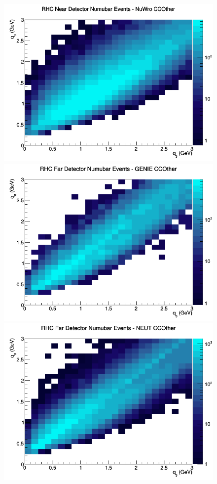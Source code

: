 \documentclass[12pt]{article}
\begin{document}
\begin{figure}[h]
\includegraphics[width=\linewidth]{eff_q0_q3/LAr/CCOther_RHC_ND_numubar_q3_q0_NuWro.png}
\endminipage
\newline
{}
\includegraphics[width=\linewidth]{eff_q0_q3/LAr/CCOther_RHC_FD_numubar_q3_q0_GENIE.png}
\endminipage
{}
\includegraphics[width=\linewidth]{eff_q0_q3/LAr/CCOther_RHC_FD_numubar_q3_q0_NEUT.png}

\end{figure}
\end{document}

